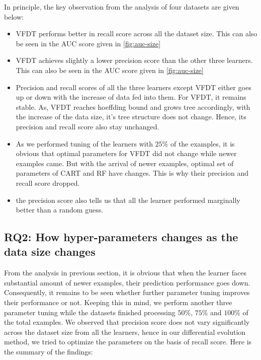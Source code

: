 \documentclass[sigplan]{acmart}\settopmatter{printfolios=true,printccs=false,printacmref=false}
\begin{document}
In principle, the key observation from the analysis of four datasets are given below: 
\begin{itemize}
	\item VFDT performs better in recall score across all the dataset size. This can also be seen in the AUC score given in \ref{fig:auc-size}
	\item VFDT achieves slightly a lower precision score than the other three learners. This can also be seen in the AUC score given in \ref{fig:auc-size}
	\item Precision and recall scores of all the three learners except VFDT either goes up or down with the increase of data fed into them. For VFDT, it remains stable. As, VFDT reaches hoeffding bound and grows tree accordingly, with the increase of the data size, it's tree structure does not change. Hence, its precision and recall score also stay unchanged.
	\item As we performed tuning of the learners with $25\%$ of the examples, it is obvious that optimal parameters for VFDT did not change while newer examples came. But with the arrival of newer examples, optimal set of parameters of CART and RF have changes. This is why their precision and recall score dropped.  
	\item the precision score also tells us that all the learner performed marginally better than a random guess. 
\end{itemize}

\subsection{RQ2: How hyper-parameters changes as the data size changes}
From the analysis in previous section, it is obvious that when the learner faces substantial amount of newer examples, their prediction performance goes down. Consequently, it remains to be seen whether further parameter tuning improves their performance or not. Keeping this in mind, we perform another three parameter tuning while the datasets finished processing $50\%$, $75\%$ and $100\%$ of the total examples. We observed that precision score does not vary significantly across the dataset size from all the learners, hence in our differential evolution method, we tried to optimize the parameters on the basis of recall score. Here is the summary of the findings:
\end{document}

